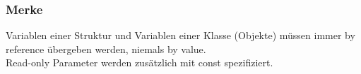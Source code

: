 \subsubsection{Merke}
\label{sec:Merke}
\begin{achtung}
Variablen einer Struktur und Variablen einer Klasse (Objekte) müssen immer by reference übergeben werden, niemals by value.\\
Read-only Parameter werden zusätzlich mit const spezifiziert.
\end{achtung}

















